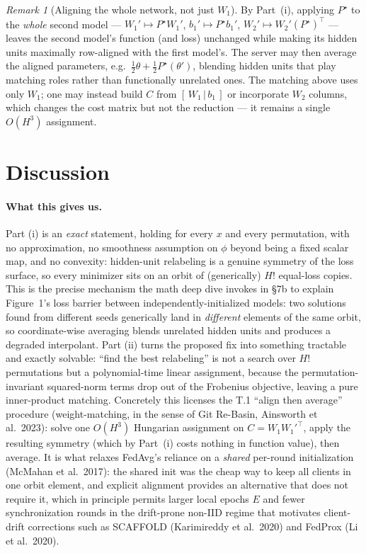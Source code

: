 \documentclass[11pt]{article}
\theoremstyle{definition}
\theoremstyle{remark}
\newtheorem{remark}[theorem]{Remark}
\begin{document}
\begin{remark}[Aligning the whole network, not just $W_1$]
By Part~(i), applying $P^{\star}$ to the \emph{whole} second model --- $W_1'\mapsto P^{\star}W_1'$,
$b_1'\mapsto P^{\star}b_1'$, $W_2'\mapsto W_2'(P^{\star})^{\top}$ --- leaves the second model's
function (and loss) unchanged while making its hidden units maximally row-aligned with the first
model's. The server may then average the aligned parameters, e.g.\
$\tfrac12\theta + \tfrac12 P^{\star}(\theta')$, blending hidden units that play matching roles rather
than functionally unrelated ones. The matching above uses only $W_1$; one may instead build $C$ from
$[\,W_1\,|\,b_1\,]$ or incorporate $W_2$ columns, which changes the cost matrix but not the
reduction --- it remains a single $O(H^3)$ assignment.
\end{remark}

\section*{Discussion}

\paragraph{What this gives us.}
Part (i) is an \emph{exact} statement, holding for every $x$ and every permutation, with no
approximation, no smoothness assumption on $\phi$ beyond being a fixed scalar map, and no convexity:
hidden-unit relabeling is a genuine symmetry of the loss surface, so every minimizer sits on an
orbit of (generically) $H!$ equal-loss copies. This is the precise mechanism the math deep dive
invokes in \S7b to explain Figure~1's loss barrier between independently-initialized models: two
solutions found from different seeds generically land in \emph{different} elements of the same orbit,
so coordinate-wise averaging blends unrelated hidden units and produces a degraded interpolant. Part
(ii) turns the proposed fix into something tractable and exactly solvable: ``find the best
relabeling'' is not a search over $H!$ permutations but a polynomial-time linear assignment, because
the permutation-invariant squared-norm terms drop out of the Frobenius objective, leaving a pure
inner-product matching. Concretely this licenses the T.1 ``align then average'' procedure
(weight-matching, in the sense of Git Re-Basin, Ainsworth et al.\ 2023): solve one $O(H^3)$
Hungarian assignment on $C=W_1 W_1'^{\top}$, apply the resulting symmetry (which by Part~(i) costs
nothing in function value), then average. It is what relaxes FedAvg's reliance on a \emph{shared}
per-round initialization (McMahan et al.\ 2017): the shared init was the cheap way to keep all
clients in one orbit element, and explicit alignment provides an alternative that does not require it,
which in principle permits larger local epochs $E$ and fewer synchronization rounds in the
drift-prone non-IID regime that motivates client-drift corrections such as SCAFFOLD
(Karimireddy et al.\ 2020) and FedProx (Li et al.\ 2020).
\end{document}
